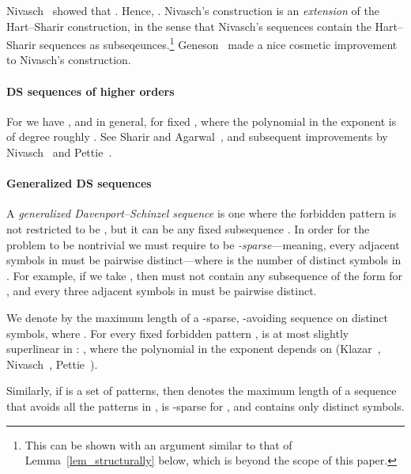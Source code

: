 \documentclass[11pt]{article}
\theoremstyle{definition}
\theoremstyle{remark}
\begin{document}
Nivasch~\cite{yo_DS} showed that . Hence, .  Nivasch's construction is an \emph{extension} of the Hart--Sharir construction, in the sense that Nivasch's sequences contain the Hart--Sharir sequences as subseqeunces.\footnote{This can be shown with an argument similar to that of Lemma~\ref{lem_structurally} below, which is beyond the scope of this paper.} Geneson~\cite{geneson} made a nice cosmetic improvement to Nivasch's construction.

\paragraph{DS sequences of higher orders}
For  we have , and in general,  for fixed , where the polynomial in the exponent is of degree roughly . See Sharir and Agarwal~\cite{DS_book}, and subsequent improvements by Nivasch~\cite{yo_DS} and Pettie~\cite{pettie_sharp}.

\paragraph{Generalized DS sequences}
A \emph{generalized Davenport--Schinzel sequence} is one where the forbidden pattern is not restricted to be , but it can be any fixed subsequence . In order for the problem to be nontrivial we must require  to be \emph{-sparse}---meaning, every  adjacent symbols in  must be pairwise distinct---where  is the number of distinct symbols in . For example, if we take , then  must not contain any subsequence of the form  for , and every three adjacent symbols in  must be pairwise distinct.

We denote by  the maximum length of a -sparse, -avoiding sequence  on  distinct symbols, where . For every fixed forbidden pattern ,  is at most slightly superlinear in : , where the polynomial in the exponent depends on  (Klazar~\cite{klazar_genDS}, Nivasch~\cite{yo_DS}, Pettie~\cite{pettie_3}).

Similarly, if  is a set of patterns, then  denotes the maximum length of a sequence that avoids all the patterns in , is -sparse for , and contains only  distinct symbols.
\end{document}
